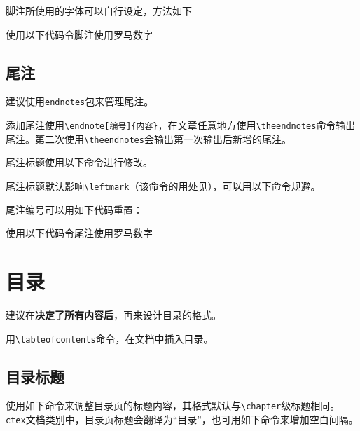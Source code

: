 \documentclass[10pt,openany]{book}
\begin{document}
脚注所使用的字体可以自行设定，方法如下



使用以下代码令脚注使用罗马数字



\section{尾注}

建议使用\texttt{endnotes}包来管理尾注。

添加尾注使用\texttt{\textbackslash{}endnote[编号]\{内容\}}，在文章任意地方使用\texttt{\textbackslash{}theendnotes}命令输出尾注。第二次使用\texttt{\textbackslash{}theendnotes}会输出第一次输出后新增的尾注。

尾注标题使用以下命令进行修改。



尾注标题默认影响\texttt{\textbackslash{}leftmark}（该命令的用处见\textit{}），可以用以下命令规避。



尾注编号可以用如下代码重置：



使用以下代码令尾注使用罗马数字



\chapter{目录}

建议在\textbf{决定了所有内容后}，再来设计目录的格式。

用\texttt{\textbackslash{}tableofcontents}命令，在文档中插入目录。

\section{目录标题}

使用如下命令来调整目录页的标题内容，其格式默认与\texttt{\textbackslash{}chapter}级标题相同。\texttt{ctex}文档类别中，目录页标题会翻译为“目录”，也可用如下命令来增加空白间隔。


\end{document}
